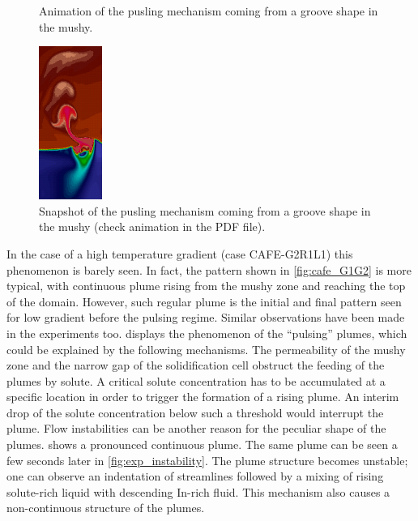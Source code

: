 \begin{figure}[htbp]
\centering
%
%
	{%
		\caption{Animation of the pusling mechanism coming from a groove shape in the mushy.}
	}
	{%
		\includegraphics[height=5cm]{Chapter4/Graphics/freckle_cafe/anim_pulsing/img2.png}
		\caption{Snapshot of the pusling mechanism coming from a groove shape in the mushy (check animation in the PDF file).} 
	}
\label{fig:animate_cafeVG1}
\end{figure}

In the case of a high temperature gradient (case CAFE-G2R1L1) this phenomenon is 
barely seen. In fact, the pattern shown in \cref{fig:cafe_G1G2} is more typical, with continuous plume rising from the mushy 
zone and reaching the top of the domain. However, such regular plume is the initial and final pattern seen for low 
gradient before the pulsing regime. Similar observations have been made in the experiments too.  displays 
the phenomenon of the “pulsing” plumes, which could be explained by the following mechanisms. The permeability of the 
mushy zone and the narrow gap of the solidification cell obstruct the feeding of the plumes by solute. A critical solute 
concentration has to be accumulated at a specific location in order to trigger the formation of a rising plume. An interim 
drop of the solute concentration below such a threshold would interrupt the plume. Flow instabilities can be another reason 
for the peculiar shape of the plumes.  shows a pronounced continuous plume. The same plume can be seen a few seconds 
later in \cref{fig:exp_instability}. The plume structure becomes unstable; one can observe an indentation of streamlines followed by a mixing of 
rising solute-rich liquid with descending In-rich fluid. This mechanism also causes a non-continuous structure of the plumes.

